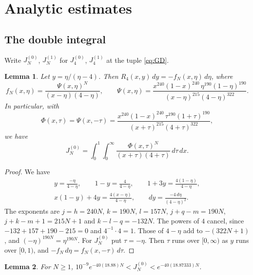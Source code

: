 \documentclass{amsart}
\newtheorem{lemma}{Lemma}[section]
\numberwithin{equation}{section}
\numberwithin{table}{section}
\begin{document}
\section{Analytic estimates}\label{sec:an}

\subsection{The double integral}
Write $J_N^{(0)}$, $J_N^{(1)}$ for $J_4^{(0)}$, $J_4^{(1)}$ at the tuple
\eqref{eq:GD}.

\begin{lemma}\label{lem:subst}
Let $y=\eta/(\eta-4)$. Then $R_4(x,y)\,dy=-f_N(x,\eta)\,d\eta$, where
\[
f_N(x,\eta)=\frac{\Psi(x,\eta)^N}{(x-\eta)(4-\eta)},\qquad
\Psi(x,\eta)=\frac{x^{240}(1-x)^{240}\,\eta^{190}(1-\eta)^{190}}
{(x-\eta)^{215}(4-\eta)^{322}} .
\]
In particular, with
\[
\Phi(x,\tau)=\Psi(x,-\tau)=\frac{x^{240}(1-x)^{240}\,\tau^{190}(1+\tau)^{190}}
{(x+\tau)^{215}(4+\tau)^{322}},
\]
we have
\[
J_N^{(0)}=\int_0^1\!\!\int_0^\infty\frac{\Phi(x,\tau)^N}{(x+\tau)(4+\tau)}\,d\tau\,dx .
\]
\end{lemma}

\begin{proof}
We have
\begin{gather*}
y=\frac{-\eta}{4-\eta},\qquad 1-y=\frac4{4-\eta},\qquad
1+3y=\frac{4(1-\eta)}{4-\eta},\\
x(1-y)+4y=\frac{4(x-\eta)}{4-\eta},\qquad dy=\frac{-4\,d\eta}{(4-\eta)^2}.
\end{gather*}
The exponents are $j=h=240N$, $k=190N$, $l=157N$, $j+q-m=190N$,
$j+k-m+1=215N+1$ and $k-l-q=-132N$. The powers of $4$ cancel, since
$-132+157+190-215=0$ and $4^{-1}\cdot4=1$. Those of $4-\eta$ add to
$-(322N+1)$, and $(-\eta)^{190N}=\eta^{190N}$. For $J_N^{(0)}$ put
$\tau=-\eta$. Then $\tau$ runs over $[0,\infty)$ as $y$ runs over $[0,1)$,
and $-f_N\,d\eta=f_N(x,-\tau)\,d\tau$.
\end{proof}

\begin{lemma}\label{lem:real}
For $N\ge1$, $10^{-9}e^{-40(18.88)N}<J_N^{(0)}<e^{-40(18.87333)N}$.
\end{lemma}
\end{document}
